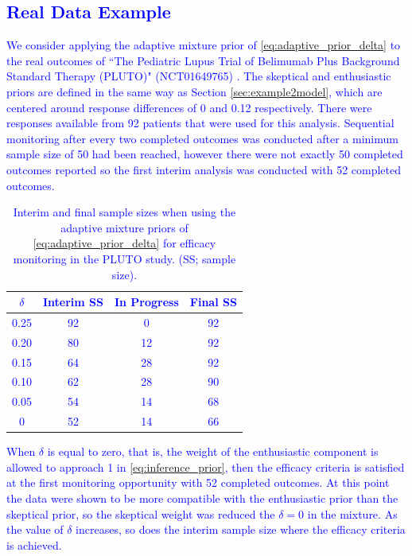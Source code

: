 \documentclass[AMA,STIX1COL,doublespace]{WileyNJD-v2}
\begin{document}
\textcolor{blue}{
\section{Real Data Example}
We consider applying the adaptive mixture prior of \eqref{eq:adaptive_prior_delta} to the real outcomes of ``The Pediatric Lupus Trial of Belimumab Plus Background Standard Therapy (PLUTO)" (NCT01649765) \citep{Brunner2020}. The skeptical and enthusiastic priors are defined in the same way as Section \ref{sec:example2model}, which are centered around response differences of 0 and 0.12 respectively. There were responses available from 92 patients that were used for this analysis. Sequential monitoring after every two completed outcomes was conducted after a minimum sample size of 50 had been reached, however there were not exactly 50 completed outcomes reported so the first interim analysis was conducted with 52 completed outcomes.
\begin{center}
\begin{table}[b]\label{tbl:real-pluto}%
\centering
\caption{Interim and final sample sizes when using the adaptive mixture priors of \eqref{eq:adaptive_prior_delta} for efficacy monitoring in the PLUTO study.\citep{Brunner2020} (SS; sample size).}%
\begin{tabular*}{300pt}{@{\extracolsep\fill}cccc@{\extracolsep\fill}}%
\toprule
\textbf{$\delta$} & \textbf{Interim SS} & \textbf{In Progress} & \textbf{Final SS}\\
\midrule
0.25	&	92	&	0	&	92	\\
0.20	&	80	&	12	&	92	\\
0.15	&	64	&	28	&	92	\\
0.10	&	62	&	28	&	90	\\
0.05	&	54	&	14	&	68	\\
0	&	52	&	14	&	66	\\
\bottomrule
\end{tabular*}
\end{table}
\end{center}
When $\delta$ is equal to zero, that is, the weight of the enthusiastic component is allowed to approach 1 in \eqref{eq:inference_prior}, then the efficacy criteria is satisfied at the first monitoring opportunity with 52 completed outcomes. At this point the data were shown to be more compatible with the enthusiastic prior than the skeptical prior, so the skeptical weight was reduced the $\delta=0$ in the mixture. As the value of $\delta$ increases, so does the interim sample size where the efficacy criteria is achieved.}
\end{document}
